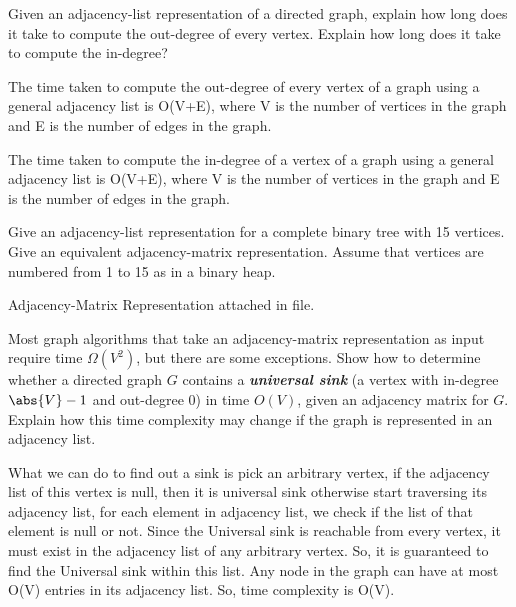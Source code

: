 \documentclass[addpoints,11pt]{exam}
\begin{document}
\begin{questions}


\question[5] Given an adjacency-list representation of a directed graph, explain how long does it take to compute the out-degree of every vertex.  Explain how long does it take to compute the in-degree?
\begin{center}
	The time taken to compute the out-degree of every vertex of a graph using a general adjacency list is O(V+E), where V is the number of vertices in the graph and E is the number of edges in the graph. \newline
	
	The time taken to compute the in-degree of a vertex of a graph using a general adjacency list is O(V+E), where V is the number of vertices in the graph and E is the number of edges in the graph.
	
\end{center}

\ifprintanswers
\newpage
\else
\bigskip
\fi



\question[5] Give an adjacency-list representation for a complete binary tree with 15 vertices.  Give an equivalent adjacency-matrix representation.  Assume that vertices are numbered from 1 to 15 as in a binary heap.
\begin{center}
Adjacency-Matrix Representation attached in file.
\end{center}

\ifprintanswers
\newpage
\else
\bigskip
\fi


\question[5] Most graph algorithms that take an adjacency-matrix representation as input require time $\Omega(V^2)$, but there are some exceptions.  Show how to determine whether a directed graph $G$ contains a \textbf{\textit{universal sink}} (a vertex with in-degree $\abs{V}-1$ and out-degree 0) in time $O(V)$, given an adjacency matrix for $G$.  Explain how this time complexity may change if the graph is represented in an adjacency list.
\begin{center}
	What we can do to find out a sink is pick an arbitrary vertex, if the adjacency list of this vertex is null, then it is universal sink otherwise start traversing its adjacency list, for each element in adjacency list, we check if the list of that element is null or not. Since the Universal sink is reachable from every vertex, it must exist in the adjacency list of any arbitrary vertex. So, it is guaranteed to find the Universal sink within this list. Any node in the graph can have at most O(V) entries in its adjacency list. So, time complexity is O(V).
\end{center}


\end{questions}
\end{document}
